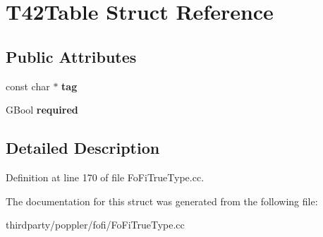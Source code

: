 \hypertarget{struct_t42_table}{}\section{T42\+Table Struct Reference}
\label{struct_t42_table}
\subsection*{Public Attributes}
\begin{DoxyCompactItemize}
\item 
\mbox{\label{struct_t42_table_a17b03c78750b79f8c1ca92bbe9507578}} 
const char $\ast$ {\bfseries tag}
\item 
\mbox{\label{struct_t42_table_a8802c4e09aa2b5da9715f86823373c5b}} 
G\+Bool {\bfseries required}
\end{DoxyCompactItemize}


\subsection{Detailed Description}


Definition at line 170 of file Fo\+Fi\+True\+Type.\+cc.



The documentation for this struct was generated from the following file\+:\begin{DoxyCompactItemize}
\item 
thirdparty/poppler/fofi/Fo\+Fi\+True\+Type.\+cc\end{DoxyCompactItemize}
